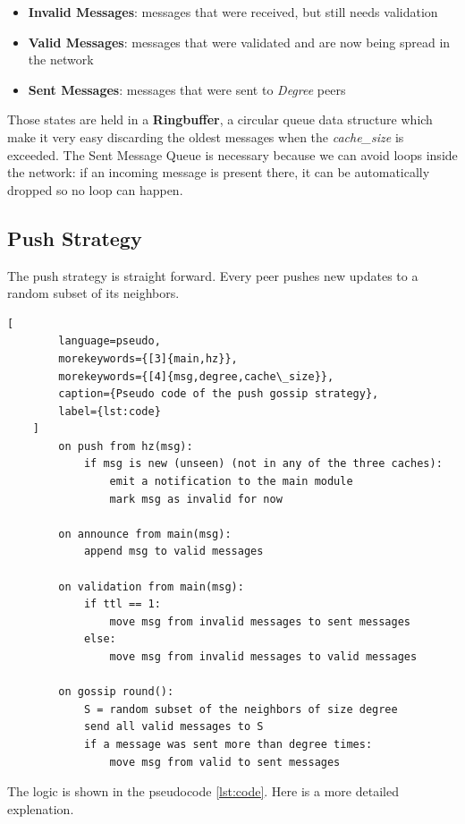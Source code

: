 \documentclass[a4paper,english,10pt,NET]{tumarticle}
\begin{document}
\begin{itemize}
	\item \textbf{Invalid Messages}: messages that were received, but still needs validation
	\item \textbf{Valid Messages}: messages that were validated and are now being spread in the network
	\item \textbf{Sent Messages}: messages that were sent to \textit{Degree} peers 
\end{itemize}

Those states are held in a \textbf{Ringbuffer}, a circular queue data structure which make it very easy discarding the oldest messages when the \textit{cache\_size} is exceeded. The Sent Message Queue is necessary because we can avoid loops inside the network: if an incoming message is present there, it can be automatically dropped so no loop can happen.

\subsection{Push Strategy}
The push strategy is straight forward.
Every peer pushes new updates to a random subset of its neighbors. 

\begin{center}
\begin{minipage}{0.50\linewidth}
	\begin{lstlisting}[
		language=pseudo,
		morekeywords={[3]{main,hz}},
		morekeywords={[4]{msg,degree,cache\_size}},
		caption={Pseudo code of the push gossip strategy},
		label={lst:code}
	]
		on push from hz(msg):
			if msg is new (unseen) (not in any of the three caches):
				emit a notification to the main module
				mark msg as invalid for now

		on announce from main(msg):
			append msg to valid messages

		on validation from main(msg):
			if ttl == 1:
				move msg from invalid messages to sent messages
			else:
				move msg from invalid messages to valid messages

		on gossip round():
			S = random subset of the neighbors of size degree
			send all valid messages to S
			if a message was sent more than degree times:
				move msg from valid to sent messages
	\end{lstlisting}
\end{minipage}
\end{center}

The logic is shown in the pseudocode \ref{lst:code}. Here is a more detailed explenation.
\end{document}
